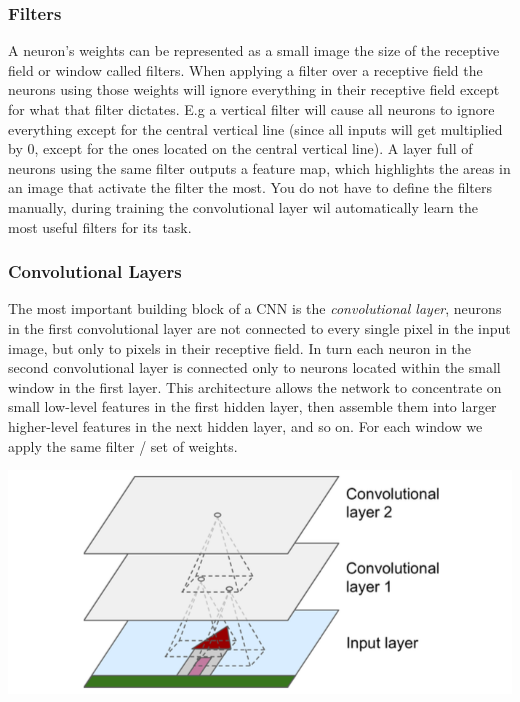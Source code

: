 \documentclass[12pt]{article}
\begin{document}
        \subsubsection{Filters}
            A neuron's weights can be represented as a small image the size of the receptive field or window called
            filters. When applying a filter over a receptive field the neurons using those weights will ignore
            everything in their receptive field except for what that filter dictates. E.g a vertical filter will cause
            all neurons to ignore everything except for the central vertical line (since all inputs will get multiplied
            by 0, except for the ones located on the central vertical line). A layer full of neurons using the same
            filter outputs a feature map, which highlights the areas in an image that activate the filter the most. You
            do not have to define the filters manually, during training the convolutional layer wil automatically learn
            the most useful filters for its task.

        \subsubsection{Convolutional Layers}
            The most important building block of a CNN is the \textit{convolutional layer}, neurons in the first
            convolutional layer are not connected to every single pixel in the input image, but only to pixels in their
            receptive field. In turn each neuron in the second convolutional layer is connected only to neurons located
            within the small window in the first layer. This architecture allows the network to concentrate on small
            low-level features in the first hidden layer, then assemble them into larger higher-level features in the
            next hidden layer, and so on. For each window we apply the same filter / set of weights. 

            \begin{center}
                \includegraphics[scale=0.65]{ConvLayer}
            \end{center}
\end{document}
